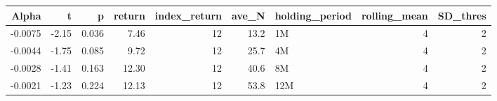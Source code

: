 \begin{table}[ht]
\centering
\begin{tabular}{rrrrrrlrr}
  \hline
Alpha & t & p & return & index\_return & ave\_N & holding\_period & rolling\_mean & SD\_thres \\ 
  \hline
-0.0075 & -2.15 & 0.036 & 7.46 & 12 & 13.2 & 1M &  4 &  2 \\ 
  -0.0044 & -1.75 & 0.085 & 9.72 & 12 & 25.7 & 4M &  4 &  2 \\ 
  -0.0028 & -1.41 & 0.163 & 12.30 & 12 & 40.6 & 8M &  4 &  2 \\ 
  -0.0021 & -1.23 & 0.224 & 12.13 & 12 & 53.8 & 12M &  4 &  2 \\ 
   \hline
\end{tabular}
\end{table}

